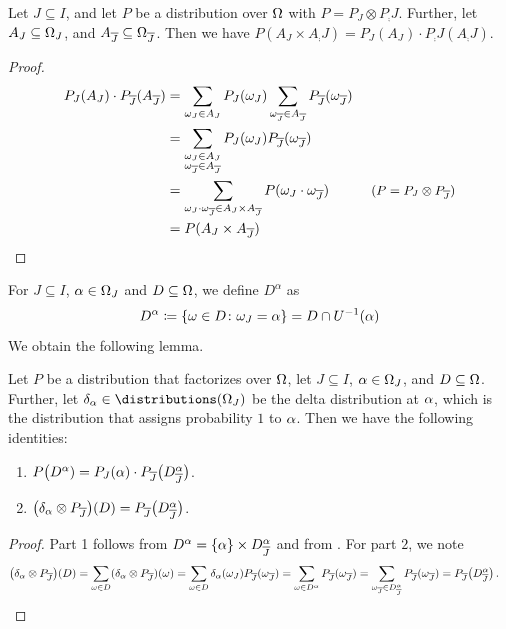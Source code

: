 \documentclass[USenglish,onecolumn]{article}
\begin{document}
\begin{lemma}
\label{lemma:cartesian_product_distribution}
    Let $J\subseteq I$, and let $P$ be a distribution over $\Omega$ with $P=P_J\otimes P_\comp{J}$. Further, let $A_J\subseteq \Omega_J$, and $A_{\overline{J}}\subseteq \Omega_{\overline{J}}$. Then we have $P(A_J\times A_\comp{J})=P_J(A_J)\cdot P_\comp{J}(A_\comp{J})$.
\end{lemma}

\begin{proof}
    \begin{align*}
    P_J(A_J)\cdot P_\comp{J}(A_\comp{J})&= \sum_{\omg_J\in A_J}P_J(\omg_J) \sum_{\omg_\comp{J}\in A_\comp{J}} P_\comp{J}(\omg_\comp{J})\\
    &= \sum_{\substack{\omg_J\in A_J\\  \omg_\comp{J}\in A_\comp{J}}}P_J(\omg_J)P_\comp{J}(\omg_\comp{J})\\
    &= \sum_{\omg_J\merge \omg_\comp{J}\in A_J\times A_\comp{J}}P(\omg_J\merge \omg_\comp{J}) &\text{\small($P=P_J\otimes P_\comp{J}$)}\\
    &=P(A_J\times A_\comp{J})
    \end{align*}
\end{proof}

For $J \subseteq I$, $\alpha \in \Omega_J$ and $D \subseteq \Omega$, we define $D^\alpha$ as 
\begin{equation}
\label{eq:D_alpha}
    D^\alpha\coloneq \{\omega\in D \colon \omega_J=\alpha\} =D\cap U^{-1}(\alpha)
\end{equation}
We obtain the following lemma.

\begin{lemma}
  \label{lemma:preparation_independence_cohistory}
  Let $P$ be a distribution that factorizes over $\Omega$, let $J \subseteq I$, $\alpha \in \Omega_J$, and $D \subseteq \Omega$. Further, let $\delta_\x \in \distributions(\Omg_J)$ be the delta distribution at $\alpha$, which is the distribution that assigns probability $1$ to $\alpha$.
  Then we have the following identities:
  \begin{enumerate}
    \item $P\big( D^\alpha
    ) = P_J(\alpha) \cdot P_{{\overline{J}}}\big(D^\alpha_{\overline{J}}\big)$. \\
    \item $\big( \delta_\alpha \otimes P_{{\overline{J}}} \big)(D) = P_{{\overline{J}}}\big(D^\alpha_{\overline{J}}\big) $.
  \end{enumerate}
\end{lemma}


\begin{proof}
  Part 1 follows from $D^\alpha = \{\alpha\} \times D^\alpha_{\overline{J}}$ and from . 
  For part $2$, we note
  \begin{align*}
    \big( \delta_\alpha \otimes P_{{\overline{J}}} \big)(D) &=\sum_{\omega\in D}(\delta_\alpha\otimes P_{\overline{J}})(\omega)=\sum_{\omega\in D}\delta_\alpha(\omega_J)P_{\overline{J}}(\omega_{\overline{J}})=\sum_{\omega\in D^\alpha}P_{\overline{J}}(\omega_{\overline{J}})=\sum_{\omega_{\overline{J}}\in D^\alpha_{\overline{J}}}P_{\overline{J}}(\omega_{\overline{J}})
    = P_{{\overline{J}}}\big( D^\alpha_{\overline{J}} \big)\,.
  \end{align*}
\end{proof}
\end{document}
